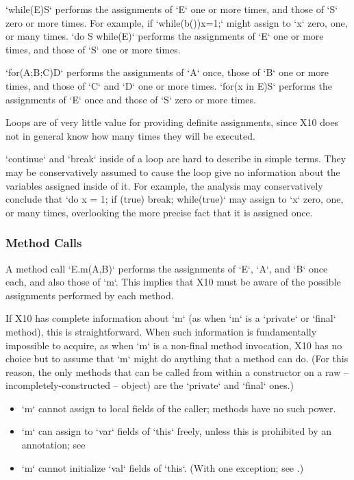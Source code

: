 \xcd`while(E)S` performs the assignments of \xcd`E` one or more times, and
those of \xcd`S` zero or more times.  For example, if \xcd`while(b()){x=1;}`
might assign to \xcd`x` zero, one, or many times.  
\xcd`do S while(E)` performs the assignments of \xcd`E` one or more times, and
those of \xcd`S` one or more times. 

\xcd`for(A;B;C)D` performs the assignments of \xcd`A` once, those of \xcd`B`
one or more times, and those of \xcd`C` and \xcd`D` one or more times.
\xcd`for(x in E)S` performs the assignments of \xcd`E` once and those of
\xcd`S` zero or more times.  

Loops are of very little value for providing definite assignments, since X10
does not in general know how many times they will be executed. 

\xcd`continue` and \xcd`break` inside of a loop are hard to describe in simple
terms.  They may be conservatively assumed to cause the loop give no
information about the variables assigned inside of it.
For example, the analysis may conservatively conclude that 
\xcd`do{ x = 1; if (true) break; } while(true)` may 
assign to \xcd`x` zero, one, or many times, overlooking the more precise fact
that it is assigned once.  




\subsubsection{Method Calls}

A method call \xcd`E.m(A,B)` performs the assignments of \xcd`E`, \xcd`A`, and
\xcd`B` once each, and also those of \xcd`m`.  This implies that X10 must be
aware of the possible assignments performed by each method.


If X10 has complete information about \xcd`m` (as when \xcd`m` is a
\xcd`private` or \xcd`final` method), this is straightforward.  When such
information is fundamentally impossible to acquire, as when \xcd`m` is a
non-final method invocation, X10 has no choice but to assume that \xcd`m`
might do anything that a method can do.    (For this reason, the only methods
that can be called from within a constructor on a raw --
incompletely-constructed -- object) are the \xcd`private` and
\xcd`final` ones.)  
\begin{itemize}
\item \xcd`m` cannot assign to local fields of the caller; methods have no
      such power.
\item \xcd`m` can assign to \xcd`var` fields of \xcd`this` freely, unless this
      is prohibited by an annotation; see 
\item \xcd`m` cannot initialize \xcd`val` fields of \xcd`this`.  (With one
      exception; see .) 
\end{itemize}

